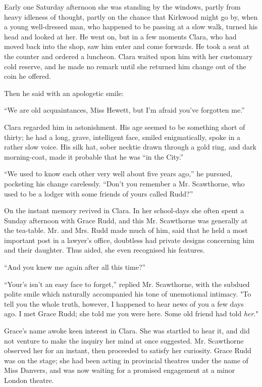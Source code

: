 Early one Saturday afternoon she was standing by the windows, partly
from heavy idleness of thought, partly on the chance that Kirkwood might
go by, when a young well-dressed man, who happened to be passing at a
slow walk, turned his head and looked at her. He went on, but in a few
moments Clara, who had moved back into the shop, saw him enter and come
forwards. He took a seat at the counter and ordered a luncheon. Clara
waited upon him with her customary cold reserve, and he made no remark
until she returned him change out of the coin he offered.

{\protect\hypertarget{205}{}{}}Then he said with an apologetic smile:

``We are old acquaintances, Miss Hewett, but I'm afraid you've forgotten
me.''

Clara regarded him in astonishment. His age seemed to be something short
of thirty; he had a long, grave, intelligent face, smiled enigmatically,
spoke in a rather slow voice. His silk hat, sober necktie drawn through
a gold ring, and dark morning-coat, made it probable that he was ``in
the City.''

``We used to know each other very well about five years ago,'' he
pursued, pocketing his change carelessly. ``Don't you remember a Mr.
Scawthorne, who used to be a lodger with some friends of yours called
Rudd?''

On the instant memory revived in Clara. In her school-days she often
spent a Sunday afternoon with Grace Rudd, and this Mr. Scawthorne was
generally at the tea-table. Mr. and Mrs. Rudd made much of him, said
that he held a most important post in a lawyer's office, doubtless had
private designs concerning him and their daughter. Thus aided, she even
recognised his features.

{\protect\hypertarget{206}{}{}}``And you knew me again after all this
time?''

``Your's isn't an easy face to forget,'' replied Mr. Scawthorne, with
the subdued polite smile which naturally accompanied his tone of
unemotional intimacy. "To tell you the whole truth, however, I happened
to hear news of you a few days ago. I met Grace Rudd; she told me you
were here. Some old friend had told \emph{her}."

Grace's name awoke keen interest in Clara. She was startled to hear it,
and did not venture to make the inquiry her mind at once suggested. Mr.
Scawthorne observed her for an instant, then proceeded to satisfy her
curiosity. Grace Rudd was on the stage; she had been acting in
provincial theatres under the name of Miss Danvers, and was now waiting
for a promised engagement at a minor London theatre.

